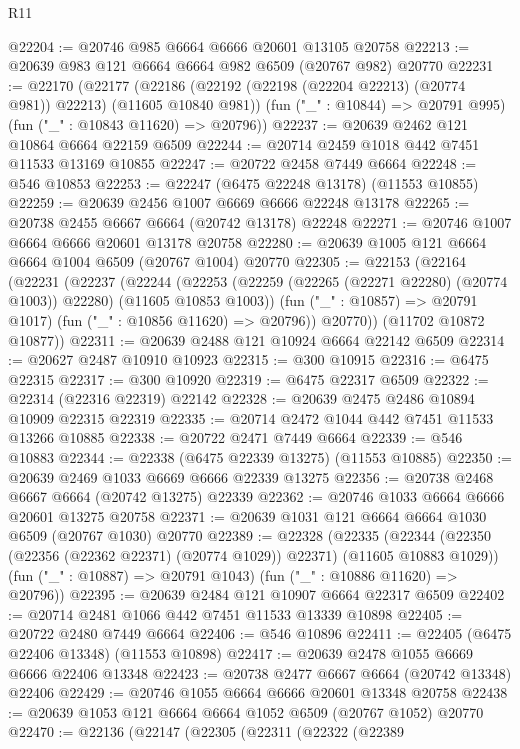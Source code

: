 \begin{lexlean}{R11}
\begin{coremodule}
@22204 := @20746 @985 @6664 @6666 @20601 @13105 @20758
@22213 := @20639 @983 @121 @6664 @6664 @982 @6509 (@20767 @982) @20770
@22231 := @22170
    (@22177
      (@22186 (@22192 (@22198 (@22204 @22213) (@20774 @981)) @22213) (@11605 @10840 @981))
      (fun ("_" : @10844) => @20791 @995)
      (fun ("_" : @10843 @11620) => @20796))
@22237 := @20639 @2462 @121 @10864 @6664 @22159 @6509
@22244 := @20714 @2459 @1018 @442 @7451 @11533 @13169 @10855
@22247 := @20722 @2458 @7449 @6664
@22248 := @546 @10853
@22253 := @22247 (@6475 @22248 @13178) (@11553 @10855)
@22259 := @20639 @2456 @1007 @6669 @6666 @22248 @13178
@22265 := @20738 @2455 @6667 @6664 (@20742 @13178) @22248
@22271 := @20746 @1007 @6664 @6666 @20601 @13178 @20758
@22280 := @20639 @1005 @121 @6664 @6664 @1004 @6509 (@20767 @1004) @20770
@22305 := @22153
    (@22164
      (@22231
        (@22237
          (@22244
            (@22253 (@22259 (@22265 (@22271 @22280) (@20774 @1003)) @22280) (@11605 @10853 @1003))
            (fun ("_" : @10857) => @20791 @1017)
            (fun ("_" : @10856 @11620) => @20796))
          @20770))
      (@11702 @10872 @10877))
@22311 := @20639 @2488 @121 @10924 @6664 @22142 @6509
@22314 := @20627 @2487 @10910 @10923
@22315 := @300 @10915
@22316 := @6475 @22315
@22317 := @300 @10920
@22319 := @6475 @22317 @6509
@22322 := @22314 (@22316 @22319) @22142
@22328 := @20639 @2475 @2486 @10894 @10909 @22315 @22319
@22335 := @20714 @2472 @1044 @442 @7451 @11533 @13266 @10885
@22338 := @20722 @2471 @7449 @6664
@22339 := @546 @10883
@22344 := @22338 (@6475 @22339 @13275) (@11553 @10885)
@22350 := @20639 @2469 @1033 @6669 @6666 @22339 @13275
@22356 := @20738 @2468 @6667 @6664 (@20742 @13275) @22339
@22362 := @20746 @1033 @6664 @6666 @20601 @13275 @20758
@22371 := @20639 @1031 @121 @6664 @6664 @1030 @6509 (@20767 @1030) @20770
@22389 := @22328
    (@22335
      (@22344 (@22350 (@22356 (@22362 @22371) (@20774 @1029)) @22371) (@11605 @10883 @1029))
      (fun ("_" : @10887) => @20791 @1043)
      (fun ("_" : @10886 @11620) => @20796))
@22395 := @20639 @2484 @121 @10907 @6664 @22317 @6509
@22402 := @20714 @2481 @1066 @442 @7451 @11533 @13339 @10898
@22405 := @20722 @2480 @7449 @6664
@22406 := @546 @10896
@22411 := @22405 (@6475 @22406 @13348) (@11553 @10898)
@22417 := @20639 @2478 @1055 @6669 @6666 @22406 @13348
@22423 := @20738 @2477 @6667 @6664 (@20742 @13348) @22406
@22429 := @20746 @1055 @6664 @6666 @20601 @13348 @20758
@22438 := @20639 @1053 @121 @6664 @6664 @1052 @6509 (@20767 @1052) @20770
@22470 := @22136
    (@22147
      (@22305
        (@22311
          (@22322
            (@22389

\end{coremodule}
\end{lexlean}
